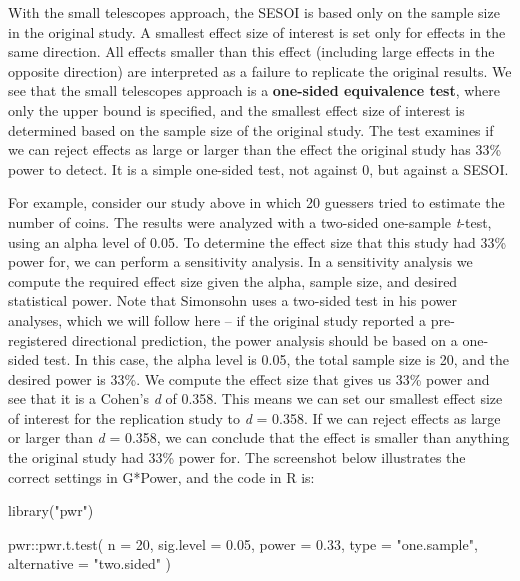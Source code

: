 \documentclass[
  oneside]{book}
\newenvironment{Shaded}{\begin{snugshade}}{\end{snugshade}}
\newcommand{\AttributeTok}[1]{\textcolor[rgb]{0.77,0.63,0.00}{#1}}
\newcommand{\DecValTok}[1]{\textcolor[rgb]{0.00,0.00,0.81}{#1}}
\newcommand{\FloatTok}[1]{\textcolor[rgb]{0.00,0.00,0.81}{#1}}
\newcommand{\FunctionTok}[1]{\textcolor[rgb]{0.00,0.00,0.00}{#1}}
\newcommand{\NormalTok}[1]{#1}
\newcommand{\SpecialCharTok}[1]{\textcolor[rgb]{0.00,0.00,0.00}{#1}}
\newcommand{\StringTok}[1]{\textcolor[rgb]{0.31,0.60,0.02}{#1}}
\begin{document}
With the small telescopes approach, the SESOI is based only on the sample size in the original study. A smallest effect size of interest is set only for effects in the same direction. All effects smaller than this effect (including large effects in the opposite direction) are interpreted as a failure to replicate the original results. We see that the small telescopes approach is a \textbf{one-sided equivalence test}, where only the upper bound is specified, and the smallest effect size of interest is determined based on the sample size of the original study. The test examines if we can reject effects as large or larger than the effect the original study has 33\% power to detect. It is a simple one-sided test, not against 0, but against a SESOI.

For example, consider our study above in which 20 guessers tried to estimate the number of coins. The results were analyzed with a two-sided one-sample \emph{t}-test, using an alpha level of 0.05. To determine the effect size that this study had 33\% power for, we can perform a sensitivity analysis. In a sensitivity analysis we compute the required effect size given the alpha, sample size, and desired statistical power. Note that Simonsohn uses a two-sided test in his power analyses, which we will follow here -- if the original study reported a pre-registered directional prediction, the power analysis should be based on a one-sided test. In this case, the alpha level is 0.05, the total sample size is 20, and the desired power is 33\%. We compute the effect size that gives us 33\% power and see that it is a Cohen's \emph{d} of 0.358. This means we can set our smallest effect size of interest for the replication study to \emph{d} = 0.358. If we can reject effects as large or larger than \emph{d} = 0.358, we can conclude that the effect is smaller than anything the original study had 33\% power for. The screenshot below illustrates the correct settings in G*Power, and the code in R is:

\begin{Shaded}
\begin{Highlighting}[]
\FunctionTok{library}\NormalTok{(}\StringTok{"pwr"}\NormalTok{)}

\NormalTok{pwr}\SpecialCharTok{::}\FunctionTok{pwr.t.test}\NormalTok{(}
  \AttributeTok{n =} \DecValTok{20}\NormalTok{, }
  \AttributeTok{sig.level =} \FloatTok{0.05}\NormalTok{, }
  \AttributeTok{power =} \FloatTok{0.33}\NormalTok{, }
  \AttributeTok{type =} \StringTok{"one.sample"}\NormalTok{,}
  \AttributeTok{alternative =} \StringTok{"two.sided"}
\NormalTok{)}
\end{Highlighting}
\end{Shaded}
\end{document}
